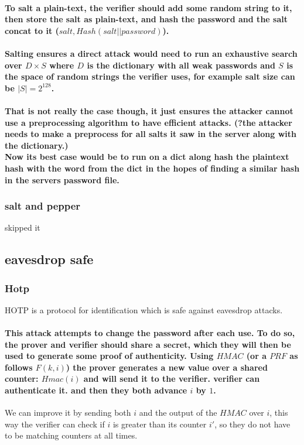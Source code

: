 \paragraph{To salt a plain-text, the verifier should add some random string
to it, then store the salt as plain-text, and hash the password and
the salt concat to it ($salt,Hash\left(salt||password\right)$).}

\paragraph{Salting ensures a direct attack would need to run an exhaustive search
over $D\times S$ where $D$ is the dictionary with all weak passwords
and $S$ is the space of random strings the verifier uses, for example
salt size can be $|S|=2^{128}$. }

\paragraph{That is not really the case though, it just ensures the attacker
cannot use a preprocessing algorithm to have efficient attacks. (?the
attacker needs to make a preprocess for all salts it saw in the server
along with the dictionary.) \protect \\
Now its best case would be to run on a dict along hash the plaintext
hash with the word from the dict in the hopes of finding a similar
hash in the servers password file.}

\subsubsection{salt and pepper}

skipped it

\subsection{eavesdrop safe}

\subsubsection{Hotp}

HOTP is a protocol for identification which is safe against eavesdrop
attacks. 

\paragraph{This attack attempts to change the password after each use. To do
so, the prover and verifier should share a secret, which they will
then be used to generate some proof of authenticity. Using $HMAC$
(or a $PRF$ as follows $F\left(k,i\right)$) the prover generates
a new value over a shared counter: $Hmac\left(i\right)$ and will
send it to the verifier. verifier can authenticate it. and then they
both advance $i$ by $1$. }
\begin{rem}
We can improve it by sending both $i$ and the output of the $HMAC$
over $i$, this way the verifier can check if $i$ is greater than
its counter $i'$, so they do not have to be matching counters at
all times.
\end{rem}

